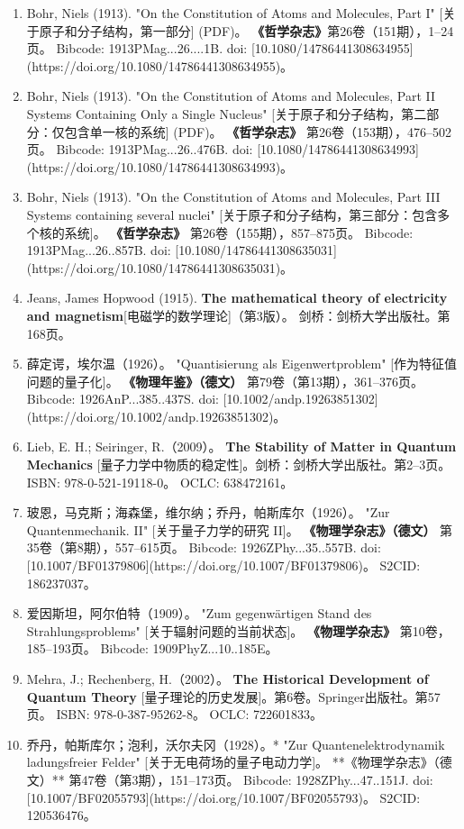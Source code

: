 \begin{enumerate}
\item Bohr, Niels (1913). 
  "On the Constitution of Atoms and Molecules, Part I" [关于原子和分子结构，第一部分] (PDF)。  
  \textbf{《哲学杂志》}第26卷（151期），1–24页。  
  Bibcode: 1913PMag...26....1B.  
  doi: [10.1080/14786441308634955](https://doi.org/10.1080/14786441308634955)。  
\item Bohr, Niels (1913).  
  "On the Constitution of Atoms and Molecules, Part II Systems Containing Only a Single Nucleus" [关于原子和分子结构，第二部分：仅包含单一核的系统] (PDF)。  
  \textbf{《哲学杂志》} 第26卷（153期），476–502页。  
  Bibcode: 1913PMag...26..476B.  
  doi: [10.1080/14786441308634993](https://doi.org/10.1080/14786441308634993)。  
\item Bohr, Niels (1913).  
  "On the Constitution of Atoms and Molecules, Part III Systems containing several nuclei" [关于原子和分子结构，第三部分：包含多个核的系统]。  
  \textbf{《哲学杂志》} 第26卷（155期），857–875页。  
  Bibcode: 1913PMag...26..857B.  
  doi: [10.1080/14786441308635031](https://doi.org/10.1080/14786441308635031)。  
\item Jeans, James Hopwood (1915). 
  \textbf{The mathematical theory of electricity and magnetism}[电磁学的数学理论]（第3版）。  
  剑桥：剑桥大学出版社。第168页。  
\item 薛定谔，埃尔温（1926）。 
  "Quantisierung als Eigenwertproblem" [作为特征值问题的量子化]。  
  \textbf{《物理年鉴》（德文）} 第79卷（第13期），361–376页。  
  Bibcode: 1926AnP...385..437S.  
  doi: [10.1002/andp.19263851302](https://doi.org/10.1002/andp.19263851302)。  
\item Lieb, E. H.; Seiringer, R.（2009）。  
  \textbf{The Stability of Matter in Quantum Mechanics} [量子力学中物质的稳定性]。剑桥：剑桥大学出版社。第2–3页。  
  ISBN: 978-0-521-19118-0。  
  OCLC: 638472161。  
\item 玻恩，马克斯；海森堡，维尔纳；乔丹，帕斯库尔（1926）。  
  "Zur Quantenmechanik. II" [关于量子力学的研究 II]。  
  \textbf{《物理学杂志》（德文）} 第35卷（第8期），557–615页。  
  Bibcode: 1926ZPhy...35..557B.  
  doi: [10.1007/BF01379806](https://doi.org/10.1007/BF01379806)。  
  S2CID: 186237037。  
\item 爱因斯坦，阿尔伯特（1909）。 
  "Zum gegenwärtigen Stand des Strahlungsproblems" [关于辐射问题的当前状态]。  
  \textbf{《物理学杂志》} 第10卷，185–193页。  
  Bibcode: 1909PhyZ...10..185E。  
\item Mehra, J.; Rechenberg, H.（2002）。  
  \textbf{The Historical Development of Quantum Theory} [量子理论的历史发展]。第6卷。Springer出版社。第57页。  
  ISBN: 978-0-387-95262-8。  
  OCLC: 722601833。  
\item 乔丹，帕斯库尔；泡利，沃尔夫冈（1928）。* 
  "Zur Quantenelektrodynamik ladungsfreier Felder" [关于无电荷场的量子电动力学]。  
  **《物理学杂志》（德文）** 第47卷（第3期），151–173页。  
  Bibcode: 1928ZPhy...47..151J.  
  doi: [10.1007/BF02055793](https://doi.org/10.1007/BF02055793)。  
  S2CID: 120536476。  


\end{enumerate}
